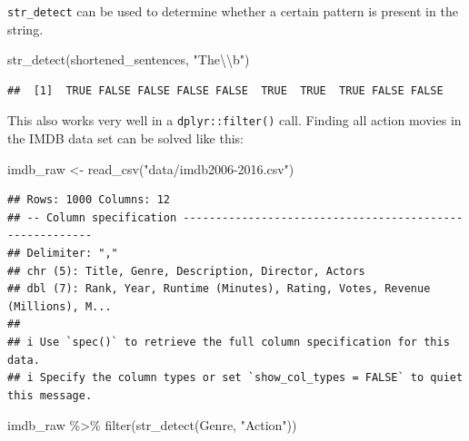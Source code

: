 \documentclass[
]{book}
\newenvironment{Shaded}{\begin{snugshade}}{\end{snugshade}}
\newcommand{\FunctionTok}[1]{\textcolor[rgb]{0.00,0.00,0.00}{#1}}
\newcommand{\NormalTok}[1]{#1}
\newcommand{\OtherTok}[1]{\textcolor[rgb]{0.56,0.35,0.01}{#1}}
\newcommand{\SpecialCharTok}[1]{\textcolor[rgb]{0.00,0.00,0.00}{#1}}
\newcommand{\StringTok}[1]{\textcolor[rgb]{0.31,0.60,0.02}{#1}}
\begin{document}
\texttt{str\_detect} can be used to determine whether a certain pattern is present in the string.

\begin{Shaded}
\begin{Highlighting}[]
\FunctionTok{str\_detect}\NormalTok{(shortened\_sentences, }\StringTok{"The}\SpecialCharTok{\textbackslash{}\textbackslash{}}\StringTok{b"}\NormalTok{)}
\end{Highlighting}
\end{Shaded}

\begin{verbatim}
##  [1]  TRUE FALSE FALSE FALSE FALSE  TRUE  TRUE  TRUE FALSE FALSE
\end{verbatim}

This also works very well in a \texttt{dplyr::filter()} call. Finding all action movies in the IMDB data set can be solved like this:

\begin{Shaded}
\begin{Highlighting}[]
\NormalTok{imdb\_raw }\OtherTok{\textless{}{-}} \FunctionTok{read\_csv}\NormalTok{(}\StringTok{"data/imdb2006{-}2016.csv"}\NormalTok{)}
\end{Highlighting}
\end{Shaded}

\begin{verbatim}
## Rows: 1000 Columns: 12
## -- Column specification --------------------------------------------------------
## Delimiter: ","
## chr (5): Title, Genre, Description, Director, Actors
## dbl (7): Rank, Year, Runtime (Minutes), Rating, Votes, Revenue (Millions), M...
## 
## i Use `spec()` to retrieve the full column specification for this data.
## i Specify the column types or set `show_col_types = FALSE` to quiet this message.
\end{verbatim}

\begin{Shaded}
\begin{Highlighting}[]
\NormalTok{imdb\_raw }\SpecialCharTok{\%\textgreater{}\%} 
  \FunctionTok{filter}\NormalTok{(}\FunctionTok{str\_detect}\NormalTok{(Genre, }\StringTok{"Action"}\NormalTok{))}
\end{Highlighting}
\end{Shaded}
\end{document}
